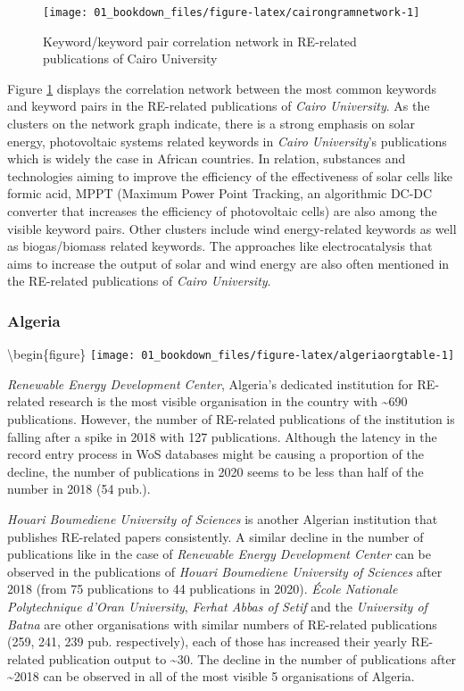 \documentclass[
]{book}
\begin{document}
\begin{figure}
\texttt{[image: 01\_bookdown\_files/figure-latex/cairongramnetwork-1]} \caption{Keyword/keyword pair correlation network in RE-related publications of Cairo University}\label{fig:cairongramnetwork}
\end{figure}

Figure \ref{fig:cairongramnetwork} displays the correlation network between the most common keywords and keyword pairs in the RE-related publications of \emph{Cairo University}. As the clusters on the network graph indicate, there is a strong emphasis on solar energy, photovoltaic systems related keywords in \emph{Cairo University}'s publications which is widely the case in African countries. In relation, substances and technologies aiming to improve the efficiency of the effectiveness of solar cells like formic acid, MPPT (Maximum Power Point Tracking, an algorithmic DC-DC converter that increases the efficiency of photovoltaic cells) are also among the visible keyword pairs. Other clusters include wind energy-related keywords as well as biogas/biomass related keywords. The approaches like electrocatalysis that aims to increase the output of solar and wind energy are also often mentioned in the RE-related publications of \emph{Cairo University}.

\hypertarget{algeria}{%
\subsubsection{Algeria}\label{algeria}}

\textbackslash begin\{figure\}
\texttt{[image: 01\_bookdown\_files/figure-latex/algeriaorgtable-1]}

\emph{Renewable Energy Development Center}, Algeria's dedicated institution for RE-related research is the most visible organisation in the country with \textasciitilde690 publications. However, the number of RE-related publications of the institution is falling after a spike in 2018 with 127 publications. Although the latency in the record entry process in WoS databases might be causing a proportion of the decline, the number of publications in 2020 seems to be less than half of the number in 2018 (54 pub.).

\emph{Houari Boumediene University of Sciences} is another Algerian institution that publishes RE-related papers consistently. A similar decline in the number of publications like in the case of \emph{Renewable Energy Development Center} can be observed in the publications of \emph{Houari Boumediene University of Sciences} after 2018 (from 75 publications to 44 publications in 2020). \emph{École Nationale Polytechnique d'Oran University}, \emph{Ferhat Abbas of Setif} and the \emph{University of Batna} are other organisations with similar numbers of RE-related publications (259, 241, 239 pub. respectively), each of those has increased their yearly RE-related publication output to \textasciitilde30. The decline in the number of publications after \textasciitilde2018 can be observed in all of the most visible 5 organisations of Algeria.
\end{document}
